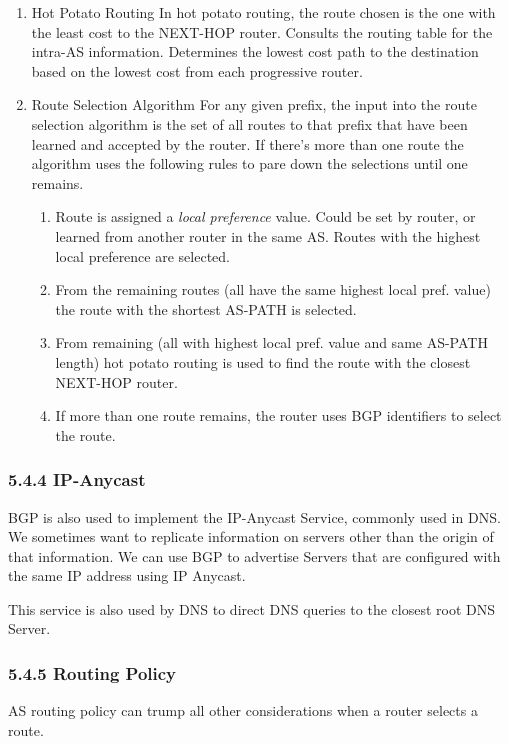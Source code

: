 \documentclass[11pt]{article}
\begin{document}
\begin{enumerate}
\item Hot Potato Routing
\label{sec:orgcb65d89}
In hot potato routing, the route chosen is the one with the least cost to the NEXT-HOP router. Consults the routing table for the intra-AS information. Determines the lowest cost path to the destination based on the lowest cost from each progressive router. 

\item Route Selection Algorithm
\label{sec:org0dc021c}
For any given prefix, the input into the route selection algorithm is the set of all routes to that prefix that have been learned and accepted by the router. If there's more than one route the algorithm uses the following rules to pare down the selections until one remains.

\begin{enumerate}
\item Route is assigned a \emph{local preference} value. Could be set by router, or learned from another router in the same AS. Routes with the highest local preference are selected.
\item From the remaining routes (all have the same highest local pref. value) the route with the shortest AS-PATH is selected.
\item From remaining (all with highest local pref. value and same AS-PATH length) hot potato routing is used to find the route with the closest NEXT-HOP router.
\item If more than one route remains, the router uses BGP identifiers to select the route.
\end{enumerate}
\end{enumerate}

\subsubsection{5.4.4 IP-Anycast}
\label{sec:org33ebf22}
BGP is also used to implement the IP-Anycast Service, commonly used in DNS.
We sometimes want to replicate information on servers other than the origin of that information. 
We can use BGP to advertise Servers that are configured with the same IP address using IP Anycast.

This service is also used by DNS to direct DNS queries to the closest root DNS Server. 

\subsubsection{5.4.5 Routing Policy}
\label{sec:org31fcb29}
AS routing policy can trump all other considerations when a router selects a route. 
\end{document}
